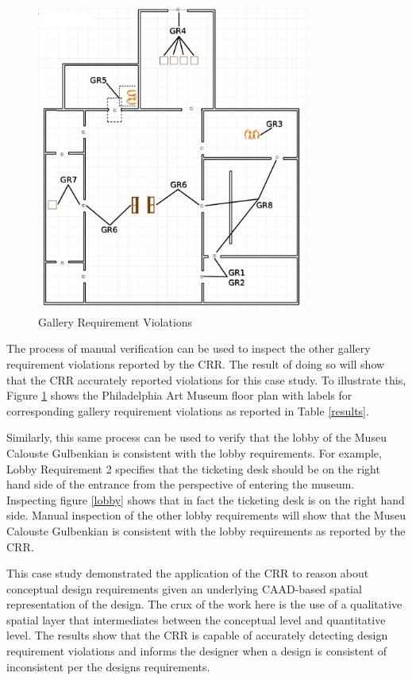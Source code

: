 \documentclass[12pt]{ucthesis}
\begin{document}
\begin{figure}[h]
\centering
\includegraphics[width=90mm]{museum-floor-plan-reqs-crop2}
\caption{Gallery Requirement Violations}
\label{art museum in archiCAD}
\end{figure}

The process of manual verification can be used to inspect the other gallery requirement violations reported by the CRR. The result of doing so will show that the CRR accurately reported violations for this case study. To illustrate this, Figure \ref{art museum in archiCAD} shows the Philadelphia Art Museum floor plan with labels for corresponding gallery requirement violations as reported in Table \ref{results}. 

Similarly, this same process can be used to verify that the lobby of the Museu Calouste Gulbenkian is consistent with the lobby requirements. For example, Lobby Requirement 2 specifies that the ticketing desk should be on the right hand side of the entrance from the perspective of entering the museum. Inspecting figure \ref{lobby} shows that in fact the ticketing desk is on the right hand side. Manual inspection of the other lobby requirements will show that the Museu Calouste Gulbenkian is consistent with the lobby requirements as reported by the CRR.

This case study demonstrated the application of the CRR to reason about conceptual design requirements given an underlying CAAD-based spatial representation of the design. The crux of the work here is the use of a qualitative spatial layer that intermediates between the conceptual level and quantitative level. The results show that the CRR is capable of accurately detecting design requirement violations and informs the designer when a design is consistent of inconsistent per the designs requirements.
\end{document}

